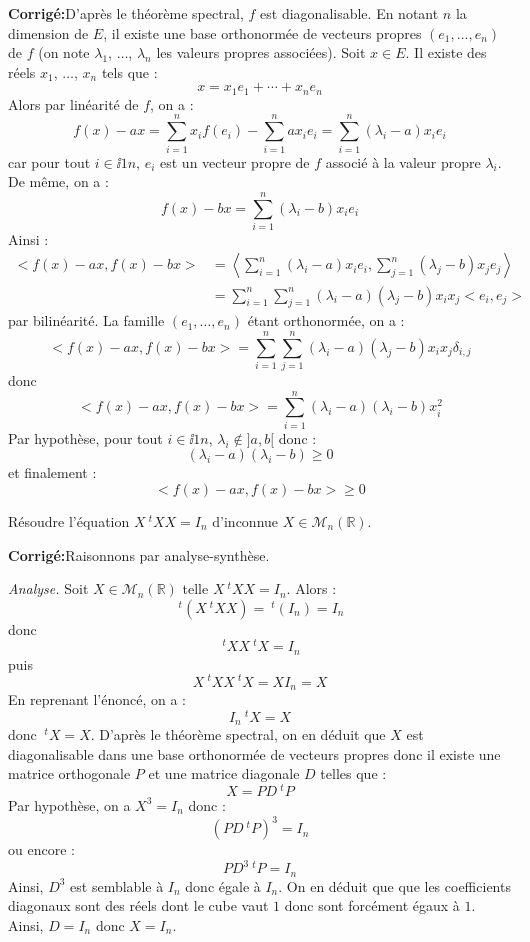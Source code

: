 \documentclass[a4paper,twoside,french,11pt]{VcCours}
\newcommand{\corr}{\textbf{Corrigé:}}
\begin{document}
\corr D'après le théorème spectral, $f$ est diagonalisable. En notant $n$ la dimension de $E$, il existe une base orthonormée de vecteurs propres $(e_1, \ldots, e_n)$ de $f$ (on note $\lambda_1$, $\ldots$, $\lambda_n$ les valeurs propres associées). Soit $x \in E$. Il existe des réels $x_1$, $\ldots$, $x_n$ tels que :
$$ x=  x_1 e_1 + \cdots +  x_n e_n$$ 
Alors par linéarité de $f$, on a :
$$ f(x)-ax = \sum_{i=1}^n x_i f(e_i) - \sum_{i=1}^n  a x_i e_i =  \sum_{i=1}^n (\lambda_i-a) x_i  e_i $$
car pour tout $i \in \ii{1}{n}$, $e_i$ est un vecteur propre de $f$ associé à la valeur propre $\lambda_i$. De même, on a :
$$ f(x)-bx = \sum_{i=1}^n (\lambda_i-b) x_i  e_i $$
Ainsi :
\begin{align*}
<f(x)-ax,f(x)-bx> & = \left< \sum_{i=1}^n (\lambda_i-a) x_i  e_i , \sum_{j=1}^n (\lambda_j-b) x_j  e_j \right> \\
& = \sum_{i=1}^n \sum_{j=1}^n (\lambda_i - a)(\lambda_j-b) x_i x_j <e_i,e_j> 
\end{align*}
par bilinéarité. La famille $(e_1, \ldots, e_n)$ étant orthonormée, on a :
$$ <f(x)-ax,f(x)-bx> = \sum_{i=1}^n \sum_{j=1}^n (\lambda_i - a)(\lambda_j-b) x_i x_j \delta_{i,j}$$
donc
$$ <f(x)-ax,f(x)-bx> = \sum_{i=1}^n (\lambda_i - a)(\lambda_i-b) x_i^2$$
Par hypothèse, pour tout $i \in \ii{1}{n}$, $\lambda_i \notin ]a,b[$ donc :
$$ (\lambda_i - a)(\lambda_i-b) \geq 0$$
et finalement :
$$ <f(x)-ax,f(x)-bx> \geq 0$$

\begin{Exercice}{} Résoudre l'équation $X ~^tX X= I_n$ d'inconnue $X \in \mathcal{M}_n(\mathbb{R})$.
\end{Exercice}

\corr Raisonnons par analyse-synthèse.


\textit{Analyse.} Soit $X \in \mathcal{M}_n(\mathbb{R})$ telle $X ~^tX X= I_n$. Alors :
$$ ~^t (X ~^tX X) =  ~^t(I_n)= I_n$$
donc
$$ ~^tX X ~^tX = I_n$$
puis
$$ X  ~^tX X ~^tX = X I_n= X$$
En reprenant l'énoncé, on a :
$$ I_n ~^tX = X$$
donc $~^tX = X$. D'après le théorème spectral, on en déduit que $X$ est diagonalisable dans une base orthonormée de vecteurs propres donc il existe une matrice orthogonale $P$ et une matrice diagonale $D$ telles que :
$$ X = PD ~^tP$$
Par hypothèse, on a $X^3=I_n$ donc :
$$ (PD ~^tP)^3= I_n$$
ou encore :
$$ PD^3 ~^tP=I_n$$
Ainsi, $D^3$ est semblable à $I_n$ donc égale à $I_n$. On en déduit que que les coefficients diagonaux sont des réels dont le cube vaut $1$ donc sont forcément égaux à $1$. Ainsi, $D=I_n$ donc $X=I_n$.
\end{document}
